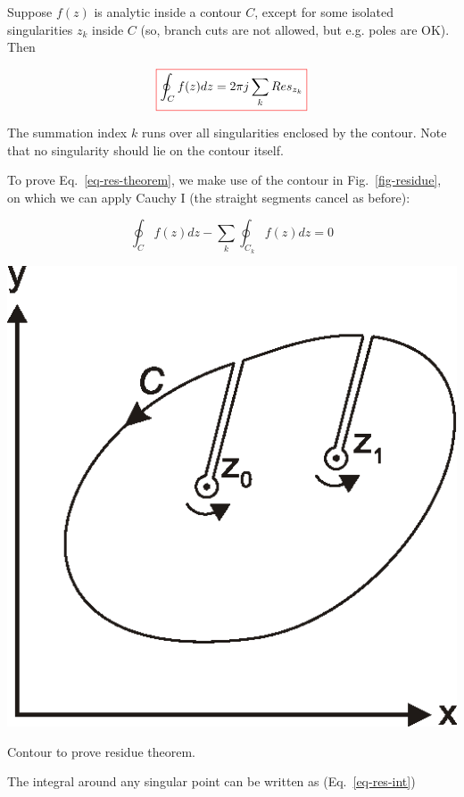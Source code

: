 Suppose $f(z)$ is analytic inside a contour ${C}$, except for some
isolated singularities $z_k$ inside ${C}$ (so, branch cuts are not
allowed, but e.g. poles are OK). Then

\begin{equation}
\fbox{$\displaystyle
\oint_{{C}} f(z) dz = 2 \pi j \sum_k Res_{z_k} \label{eq-res-theorem}
$}
\end{equation} 

The summation index $k$ runs over all singularities enclosed by the contour.
Note that no singularity should lie on the contour itself.

To prove Eq.~\ref{eq-res-theorem}, we make use of the contour in
Fig.~\ref{fig-residue}, on which we can apply Cauchy I (the straight segments
cancel as before):

\begin{equation}
\oint_{{C}} f(z) dz - \sum_k \oint_{{C}_k} f(z) dz = 0
\label{eq-res-proof-1}
\end{equation}

\begin{marginfigure}
\centering
\includegraphics{complex/figures/residue}
\caption{Contour to prove residue theorem.}
\label{fig-residue}
\end{marginfigure}

The integral around any singular point can be written as (Eq.~\ref{eq-res-int})

